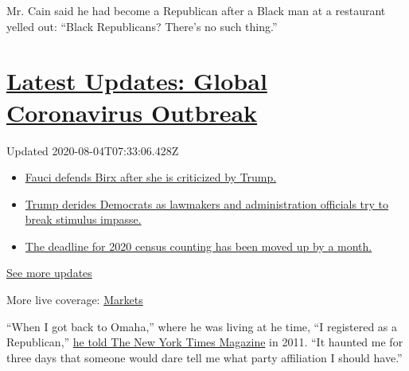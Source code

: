 Mr. Cain said he had become a Republican after a Black man at a
restaurant yelled out: ``Black Republicans? There's no such thing.''

\hypertarget{latest-updates-global-coronavirus-outbreak}{%
\section{\texorpdfstring{\href{https://www.nytimes.com/2020/08/03/world/coronavirus-covid-19.html?action=click\&pgtype=Article\&state=default\&region=MAIN_CONTENT_1\&context=storylines_live_updates}{Latest
Updates: Global Coronavirus
Outbreak}}{Latest Updates: Global Coronavirus Outbreak}}\label{latest-updates-global-coronavirus-outbreak}}

Updated 2020-08-04T07:33:06.428Z

\begin{itemize}
\tightlist
\item
  \href{https://www.nytimes.com/2020/08/03/world/coronavirus-covid-19.html?action=click\&pgtype=Article\&state=default\&region=MAIN_CONTENT_1\&context=storylines_live_updates\#link-4547638f}{Fauci
  defends Birx after she is criticized by Trump.}
\item
  \href{https://www.nytimes.com/2020/08/03/world/coronavirus-covid-19.html?action=click\&pgtype=Article\&state=default\&region=MAIN_CONTENT_1\&context=storylines_live_updates\#link-15e7f995}{Trump
  derides Democrats as lawmakers and administration officials try to
  break stimulus impasse.}
\item
  \href{https://www.nytimes.com/2020/08/03/world/coronavirus-covid-19.html?action=click\&pgtype=Article\&state=default\&region=MAIN_CONTENT_1\&context=storylines_live_updates\#link-e5a2cda}{The
  deadline for 2020 census counting has been moved up by a month.}
\end{itemize}

\href{https://www.nytimes.com/2020/08/03/world/coronavirus-covid-19.html?action=click\&pgtype=Article\&state=default\&region=MAIN_CONTENT_1\&context=storylines_live_updates}{See
more updates}

More live coverage:
\href{https://www.nytimes.com/live/2020/08/03/business/stock-market-today-coronavirus?action=click\&pgtype=Article\&state=default\&region=MAIN_CONTENT_1\&context=storylines_live_updates}{Markets}

``When I got back to Omaha,'' where he was living at he time, ``I
registered as a Republican,''
\href{https://www.nytimes.com/2011/07/03/magazine/herman-cain-talks-about-herman-cain.html}{he
told The New York Times Magazine} in 2011. ``It haunted me for three
days that someone would dare tell me what party affiliation I should
have.''

